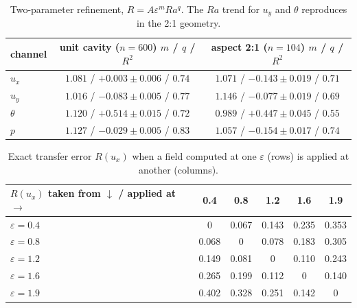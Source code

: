 \documentclass[preprint,11pt,a4paper,times,doubleblind]{elsarticle}
\begin{document}
\begin{table}[htbp]
\centering
\small
\caption{Two-parameter refinement, $R=A\varepsilon^mRa^q$. The $Ra$ trend for $u_y$ and $\theta$
reproduces in the 2:1 geometry.}
\label{tab:two-param}
\begin{tabular}{@{}lcc@{}}
\toprule
channel & unit cavity ($n=600$) $m$ / $q$ / $R^2$ & aspect 2:1 ($n=104$) $m$ / $q$ / $R^2$\\
\midrule
$u_x$ & $1.081$ / $+0.003\pm0.006$ / $0.74$ & $1.071$ / $-0.143\pm0.019$ / $0.71$\\
$u_y$ & $1.016$ / $-0.083\pm0.005$ / $0.77$ & $1.146$ / $-0.077\pm0.019$ / $0.69$\\
$\theta$ & $1.120$ / $+0.514\pm0.015$ / $0.72$ & $0.989$ / $+0.447\pm0.045$ / $0.55$\\
$p$ & $1.127$ / $-0.029\pm0.005$ / $0.83$ & $1.057$ / $-0.154\pm0.017$ / $0.74$\\
\bottomrule
\end{tabular}
\end{table}

\begin{table}[htbp]
\centering
\small
\caption{Exact transfer error $R(u_x)$ when a field computed at one $\varepsilon$ (rows) is
applied at another (columns).}
\label{tab:transfer-matrix}
\begin{tabular}{@{}lccccc@{}}
\toprule
$R(u_x)$ taken from $\downarrow$ / applied at $\to$ & 0.4 & 0.8 & 1.2 & 1.6 & 1.9\\
\midrule
$\varepsilon=0.4$ & 0 & 0.067 & 0.143 & 0.235 & 0.353\\
$\varepsilon=0.8$ & 0.068 & 0 & 0.078 & 0.183 & 0.305\\
$\varepsilon=1.2$ & 0.149 & 0.081 & 0 & 0.110 & 0.243\\
$\varepsilon=1.6$ & 0.265 & 0.199 & 0.112 & 0 & 0.140\\
$\varepsilon=1.9$ & 0.402 & 0.328 & 0.251 & 0.142 & 0\\
\bottomrule
\end{tabular}
\end{table}
\end{document}
